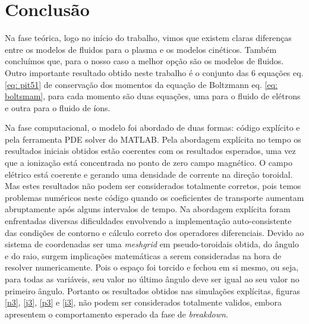 \documentclass[12pt,oneside,a4paper]{abntex2}
\begin{document}
\chapter{Conclusão}

\noindent Na fase teórica, logo no início do trabalho, vimos que existem claras diferenças entre os modelos de fluidos para o plasma e os modelos cinéticos. Também concluímos que, para o nosso caso a melhor opção são os modelos de fluidos. 
Outro importante resultado obtido neste trabalho é o conjunto das 6 equações eq. \ref{eq: pit51} de conservação dos momentos da equação de Boltzmann eq. \ref{eq: boltsmam}, para cada momento são duas equações, uma para o fluido de elétrons e outra para o fluido de íons. 

Na fase computacional, o modelo foi abordado de duas formas: código explícito e pela ferramenta PDE solver do MATLAB. 
Pela abordagem explícita no tempo os resultados iniciais obtidos estão coerentes com os resultados esperados, uma vez que a ionização está concentrada no ponto de zero campo magnético. O campo elétrico está coerente e gerando uma densidade de corrente na direção toroidal.%
Mas estes resultados não podem ser considerados totalmente corretos, pois temos problemas numéricos neste código quando os coeficientes de transporte aumentam abruptamente após alguns intervalos de tempo. %
Na abordagem explícita foram enfrentadas diversas dificuldades envolvendo a implementação auto-consistente das condições de contorno e cálculo correto dos operadores diferenciais. 
Devido ao sistema de coordenadas ser uma \textit{meshgrid} em pseudo-toroidais obtida, do ângulo e do raio, surgem implicações matemáticas a serem consideradas na hora de resolver numericamente. Pois o espaço foi torcido e fechou em si mesmo, ou seja, para todas as variáveis, seu valor no último ângulo deve ser igual ao seu valor no primeiro ângulo. 
Portanto os resultados obtidos nas simulações explícitas, figuras \ref{n3}, \ref{j3}, \ref{p3} e \ref{i3}, não podem ser considerados totalmente validos, embora apresentem o comportamento esperado da fase de \textit{breakdown}.
\end{document}
